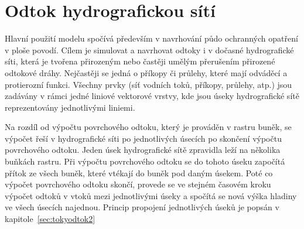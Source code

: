 





\section{Odtok hydrografickou sítí} \label{sec:tokyodtok}


Hlavní použití modelu \smod spočívá především v navrhování půdo ochranných opatření v ploše povodí. Cílem je simulovat a navrhovat odtoky i v dočasné hydrografické síti, která je tvořena přirozeným nebo častěji umělým přerušením přirozené odtokové dráhy. Nejčastěji se jedná o příkopy či průlehy, které mají odváděcí a protierozní funkci. 
Všechny prvky (síť vodních toků, příkopy, průlehy, atp.) jsou zadávány v rámci jedné liniové vektorové vrstvy, kde jsou úseky hydrografické sítě reprezentovány jednotlivými liniemi. 

Na rozdíl od výpočtu  povrchového odtoku, který je prováděn v rastru buněk, se  výpočet řeší v hydrografické síti po jednotlivých úsecích po skončení výpočtu povrchového odtoku. Jeden úsek hydrografické sítě zpravidla leží na několika buňkách rastru. Při výpočtu povrchového odtoku se do tohoto úseku započítá přítok ze všech buněk, které vtékají do buněk pod daným úsekem. Poté co výpočet povrchového odtoku skončí, provede se ve stejném časovém kroku výpočet odtoků v vtoků mezi jednotlivými úseky a spočítá se nová výška hladiny ve všech úsecích najednou. Princip propojení jednotlivých úseků je popsán v kapitole~\ref{sec:tokyodtok2}

